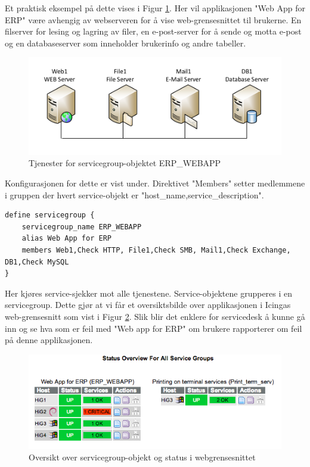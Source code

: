 Et praktisk eksempel på dette vises i Figur \ref{servicegroup_layout}. Her vil applikasjonen "Web App for ERP" være avhengig av webserveren for å vise web-grensesnittet til brukerne. En filserver for lesing og lagring av filer, en e-post-server for å sende og motta e-post og en databaseserver som inneholder brukerinfo og andre tabeller. 

\begin{figure}[H]
    \centering
    \includegraphics[scale=0.6]{img/servicegroup_layout}
    \caption{Tjenester for servicegroup-objektet ERP\_WEBAPP}
    \label{servicegroup_layout}
\end{figure}

Konfigurasjonen for dette er vist under. Direktivet "Members" setter medlemmene i gruppen der hvert service-objekt er "host\_name,service\_description".

\begin{lstlisting}
define servicegroup {
	servicegroup_name ERP_WEBAPP
	alias Web App for ERP
	members Web1,Check HTTP, File1,Check SMB, Mail1,Check Exchange, DB1,Check MySQL
}
\end{lstlisting}

Her kjøres service-sjekker mot alle tjenestene. Service-objektene grupperes i en servicegroup. Dette gjør at vi får et oversiktsbilde over applikasjonen i Icingas web-grensesnitt som vist i Figur \ref{servicegroup_web}. Slik blir det enklere for servicedesk å kunne gå inn og se hva som er feil med "Web app for ERP" om brukere rapporterer om feil på denne applikasjonen.

\begin{figure}[H]
    \centering
    \includegraphics[scale=0.6]{img/servicegroup_web}
    \caption{ Oversikt over servicegroup-objekt og status i webgrensesnittet}
    \label{servicegroup_web}
\end{figure}

